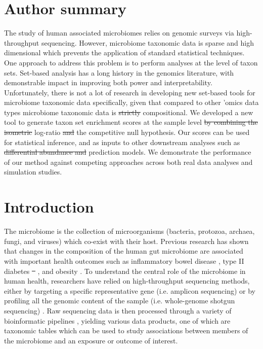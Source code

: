 \documentclass[10pt,letterpaper]{article}
\providecommand{\DIFaddtex}[1]{{\protect\color{blue}\uwave{#1}}} %
\providecommand{\DIFdeltex}[1]{{\protect\color{red}\sout{#1}}}                      %
\providecommand{\DIFaddbegin}{} %
\providecommand{\DIFaddend}{} %
\providecommand{\DIFdelbegin}{} %
\providecommand{\DIFdelend}{} %
\providecommand{\DIFadd}[1]{\texorpdfstring{\DIFaddtex{#1}}{#1}} %
\providecommand{\DIFdel}[1]{\texorpdfstring{\DIFdeltex{#1}}{}} %
\newcommand{\DIFscaledelfig}{0.5}
\newlength{\DIFdelgraphicswidth} %
\newlength{\DIFdelgraphicsheight} %
\newcommand{\DIFaddincludegraphics}[2][]{{\color{blue}\fbox{\DIFOincludegraphics[#1]{#2}}}} %
\newcommand{\DIFdelincludegraphics}[2][]{%
\sbox{\DIFdelgraphicsbox}{\DIFOincludegraphics[#1]{#2}}%
\settoboxwidth{\DIFdelgraphicswidth}{\DIFdelgraphicsbox} %
\settoboxtotalheight{\DIFdelgraphicsheight}{\DIFdelgraphicsbox} %
\scalebox{\DIFscaledelfig}{%
\parbox[b]{\DIFdelgraphicswidth}{\usebox{\DIFdelgraphicsbox}\\[-\baselineskip] \rule{\DIFdelgraphicswidth}{0em}}\llap{\resizebox{\DIFdelgraphicswidth}{\DIFdelgraphicsheight}{%
\setlength{\unitlength}{\DIFdelgraphicswidth}%
\begin{picture}(1,1)%
\thicklines\linethickness{2pt} %
{\color[rgb]{1,0,0}\put(0,0){\framebox(1,1){}}}%
{\color[rgb]{1,0,0}\put(0,0){\line( 1,1){1}}}%
{\color[rgb]{1,0,0}\put(0,1){\line(1,-1){1}}}%
\end{picture}%
}\hspace*{3pt}}} %
} %
\DeclareRobustCommand{\DIFaddbegin}{\DIFOaddbegin \let\includegraphics\DIFaddincludegraphics} %
\DeclareRobustCommand{\DIFaddend}{\DIFOaddend \let\includegraphics\DIFOincludegraphics} %
\DeclareRobustCommand{\DIFdelbegin}{\DIFOdelbegin \let\includegraphics\DIFdelincludegraphics} %
\DeclareRobustCommand{\DIFdelend}{\DIFOaddend \let\includegraphics\DIFOincludegraphics} %
\begin{document}
\section*{Author summary}
The study of human associated microbiomes relies on genomic surveys via high-throughput sequencing. However, microbiome taxonomic data is sparse and high dimensional which prevents the application of standard statistical techniques. One approach to address this problem is to perform analyses at the level of taxon sets. Set-based analysis has a long history in the genomics literature, with demonstrable impact in improving both power and interpretability. Unfortunately, there is not a lot of research in developing new set-based tools for microbiome taxonomic data specifically, given that compared to other 'omics data types microbiome taxonomic data is \DIFdelbegin \DIFdel{strictly }\DIFdelend compositional. We developed a new tool to generate taxon set enrichment scores at the sample level \DIFdelbegin \DIFdel{by combining the isometric }\DIFdelend \DIFaddbegin \DIFadd{through a novel }\DIFaddend log-ratio \DIFdelbegin \DIFdel{and }\DIFdelend \DIFaddbegin \DIFadd{formulation based on }\DIFaddend the competitive null hypothesis. Our scores can be used for statistical inference, and as inputs to other downstream analyses such as \DIFdelbegin \DIFdel{differential abundance and }\DIFdelend prediction models. We demonstrate the performance of our method against competing approaches across both real data analyses and simulation studies. 

\linenumbers

\section*{Introduction}
The microbiome is the collection of microorganisms (bacteria, protozoa, archaea, fungi, and viruses) which co-exist with their host. Previous research has shown that changes in the composition of the human gut microbiome are associated with important health outcomes such as inflammatory bowel disease \cite{proctor2019}, type II diabetes \DIFdelbegin \DIFdel{\mbox{%
\cite{sharma2019}}\hspace{0pt}%
}\DIFdelend \DIFaddbegin \DIFadd{\mbox{%
\cite{sharma2019a}}\hspace{0pt}%
}\DIFaddend , and obesity \cite{aoun2020}. To understand the central role of the microbiome in human health, researchers have relied on high-throughput sequencing methods, either by targeting a specific representative gene (i.e. amplicon sequencing) or by profiling all the genomic content of the sample (i.e. whole-genome shotgun sequencing) \cite{cho2012}. Raw sequencing data is then processed through a variety of bioinformatic pipelines \cite{callahan2016, truong2015}, yielding various data products, one of which are taxonomic tables which can be used to study associations between members of the microbiome and an exposure or outcome of interest. 
\end{document}
